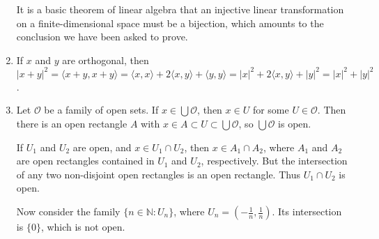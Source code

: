 \documentclass{article}
\begin{document}
\begin{enumerate}[label=\textbf{1-\arabic*.}]
It is a basic theorem of linear algebra that an injective linear transformation on a finite-dimensional space must be a bijection, which amounts to the conclusion we have been asked to prove.
\item If $x$ and $y$ are orthogonal, then $|x+y|^2 = \langle x+y,x+y\rangle = \langle x,x\rangle + 2\langle x,y\rangle + \langle y,y\rangle = |x|^2 + 2\langle x,y\rangle + |y|^2 = |x|^2 + |y|^2$.
\item Let $\mathcal{O}$ be a family of open sets. If $x\in\bigcup \mathcal O$, then $x\in U$ for some $U\in \mathcal O$. Then there is an open rectangle $A$ with $x\in A\subset U \subset \bigcup\mathcal O$, so $\bigcup\mathcal O$ is open.

If $U_1$ and $U_2$ are open, and $x\in U_1\cap U_2$, then $x\in A_1\cap A_2$, where $A_1$ and $A_2$ are open rectangles contained in $U_1$ and $U_2$, respectively. But the intersection of any two non-disjoint open rectangles is an open rectangle. Thus $U_1\cap U_2$ is open.

Now consider the family $\{n\in\mathbb N: U_n\}$, where $U_n = (-\frac{1}{n},\frac{1}{n})$. Its intersection is $\{0\}$, which is not open.
\end{enumerate}
\end{document}
